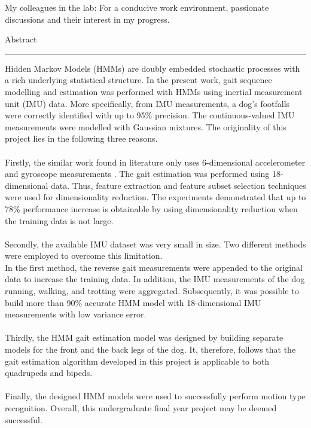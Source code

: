 \documentclass[a4paper,12pt]{report}
\begin{document}
{My colleagues in the lab: For a conducive work environment, passionate discussions and their interest in my progress.
\newpage

{\Large Abstract}\\
\hrule

Hidden Markov Models (HMMs) are doubly embedded stochastic processes with a rich underlying statistical structure. 
In the present work, gait sequence modelling and estimation was performed with HMMs using inertial measurement unit (IMU) data. More specifically, from IMU measurements, a dog's footfalls were correctly identified with up to 95\% precision. The continuous-valued IMU measurements were modelled with Gaussian mixtures. The originality of this project lies in the following three reasons. \\\\
Firstly, the similar work found in literature only uses 6-dimensional accelerometer and gyroscope measurements \cite{ches2012} \cite{cont2013}. The gait estimation was performed using 18-dimensional data. Thus, feature extraction and feature subset selection techniques were used for dimensionality reduction. The experiments demonstrated that up to 78\% performance increase is obtainable by using dimensionality reduction when the training data is not large.\\\\
Secondly, the available IMU dataset was very small in size. Two different methods were employed to overcome this limitation. \\In the first method,
the reverse gait measurements were appended to the original data to increase the training data. In addition, the IMU measurements of the dog running, walking, and trotting were aggregated. 
Subsequently, it was possible to build more than 90\% accurate HMM model with 18-dimensional IMU measurements with low variance error.\\\\
Thirdly, the HMM gait estimation model was designed by building separate models for the front and the back legs of the dog. It, therefore, follows that the gait estimation algorithm developed in this project is applicable to both quadrupeds and bipeds.\\\\
Finally, the designed HMM models were used to successfully perform motion type recognition. Overall, this undergraduate final year project may be deemed successful.
\newpage
\tableofcontents

}
\end{document}
